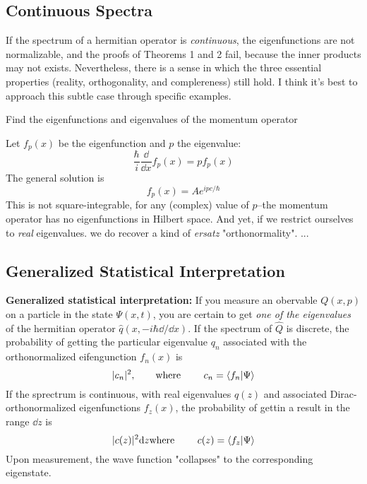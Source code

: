 \subsection{Continuous Spectra}
If the spectrum of a hermitian operator is \textit{continuous}, the eigenfunctions are not normalizable, and the proofs of Theorems 1 and 2 fail, because the inner products may not exists. Nevertheless, there is a sense in which the three essential properties (reality, orthogonality, and complereness) still hold. I think it's best to approach this subtle case through specific examples.

\begin{example}
	Find the eigenfunctions and eigenvalues of the momentum operator
\end{example}
\begin{sol}
\end{sol}
Let $f_p(x)$ be the eigenfunction and $p$ the eigenvalue:
\begin{equation}\label{3.30}
	\frac{\hbar}{i}\frac{\dd}{\dd x}f_p(x)=pf_p(x)
\end{equation}
The general solution is $$f_p(x)=Ae^{ipc/\hbar}$$ This is not square-integrable, for any (complex) value of $p$--the momentum operator has no eigenfunctions in Hilbert space. And yet, if we restrict ourselves to \textit{real} eigenvalues. we do recover a kind of \textit{ersatz} "orthonormality". ...

\subsection{Generalized Statistical Interpretation}
\textbf{Generalized statistical interpretation:} If you measure an obervable $Q(x,p)$ on a particle in the state $\Psi(x,t)$, you are certain to get \textit{one of the eigenvalues} of the hermitian operator $\hat{q}(x,-i\hbar\dd/\dd x)$. If the spectrum of $\hat{Q}$ is discrete, the probability of getting the particular eigenvalue $q_n$ associated with the orthonormalized eifengunction $f_n(x)$ is
\begin{equation}\label{3.43}
	|c_n|^2,\qquad \mbox{where }\qquad c_n=\braket{f_n}{\Psi}
\end{equation}
If the sprectrum is continuous, with real eigenvalues $q(z)$ and associated Dirac-orthonormalized eigenfunctions $f_z(x)$, the probability of gettin a result in the range $\dd z$ is
\begin{equation}\label{3.44}
	|c(z)|^2\dd z \mbox{where }\qquad c(z)=\braket{f_z}{\Psi}
\end{equation}
Upon measurement, the wave function "collapses" to the corresponding eigenstate.

